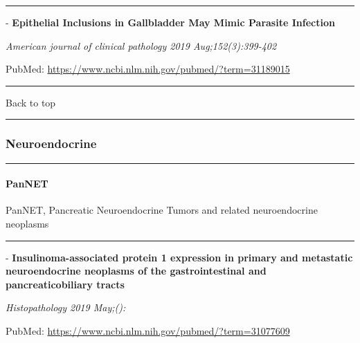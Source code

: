 \documentclass[]{article}
\let\oldparagraph\paragraph
\renewcommand{\paragraph}[1]{\oldparagraph{#1}\mbox{}}
\begin{document}
{}

{}

\begin{center}\rule{0.5\linewidth}{\linethickness}\end{center}

 - \textbf{Epithelial Inclusions in Gallbladder May Mimic Parasite
Infection}

\emph{American journal of clinical pathology 2019 Aug;152(3):399-402}

PubMed: \url{https://www.ncbi.nlm.nih.gov/pubmed/?term=31189015}

{}

{}

\begin{center}\rule{0.5\linewidth}{\linethickness}\end{center}

Back to top

\begin{center}\rule{0.5\linewidth}{\linethickness}\end{center}

\pagebreak

\hypertarget{neuroendocrine}{%
\subsubsection{Neuroendocrine}\label{neuroendocrine}}

\begin{center}\rule{0.5\linewidth}{\linethickness}\end{center}

\hypertarget{pannet}{%
\paragraph{PanNET}\label{pannet}}

PanNET, Pancreatic Neuroendocrine Tumors and related neuroendocrine
neoplasms

\begin{center}\rule{0.5\linewidth}{\linethickness}\end{center}

 - \textbf{Insulinoma-associated protein 1 expression in primary and
metastatic neuroendocrine neoplasms of the gastrointestinal and
pancreaticobiliary tracts}

\emph{Histopathology 2019 May;():}

PubMed: \url{https://www.ncbi.nlm.nih.gov/pubmed/?term=31077609}
\end{document}

